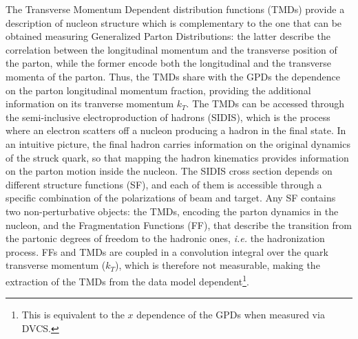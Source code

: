 The Transverse Momentum Dependent distribution functions (TMDs) provide a description of nucleon structure which is complementary to the one that can be obtained measuring Generalized Parton Distributions: the latter describe the correlation between the longitudinal momentum and the transverse position of the parton, while the former encode both the longitudinal and the transverse momenta of the parton. 
%
Thus, the TMDs share with the GPDs the dependence on the parton longitudinal momentum fraction, providing the additional information on its tranverse momentum $k_T$. 
The TMDs can be accessed through the semi-inclusive electroproduction of hadrons (SIDIS), which is the process where an electron scatters off a nucleon producing a hadron in the final state. In an intuitive picture, the final hadron carries information on the original dynamics of the struck quark, so that mapping the hadron kinematics provides information on the parton motion inside the nucleon.
The SIDIS cross section depends on different structure functions (SF), and each of them is accessible through a specific combination of the polarizations of beam and target. 
Any SF contains two non-perturbative objects: the TMDs, encoding the parton dynamics in the nucleon, and the Fragmentation Functions (FF), that describe the transition from the partonic degrees of freedom to the hadronic ones, \textit{i.e.} the hadronization process. 
FFs and TMDs are coupled in a convolution integral over the quark transverse momentum ($k_T$), which is therefore not measurable, making the extraction of the TMDs from the data model dependent\footnote{This is equivalent to the $x$ dependence of the GPDs when measured via DVCS.}. \\

